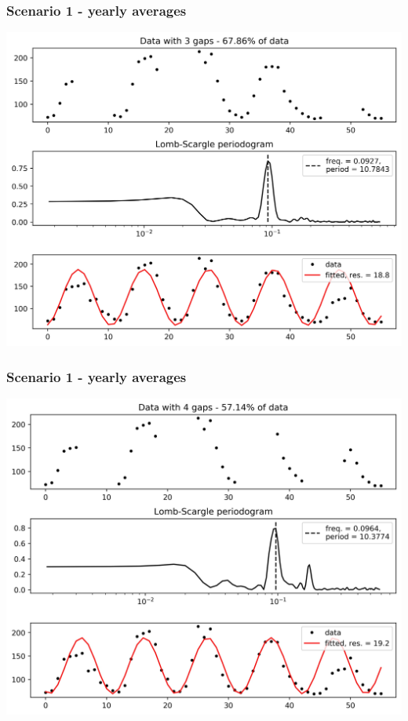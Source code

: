 \documentclass{beamer}
\begin{document}
\begin{frame}
\frametitle{Scenario 1 - yearly averages}
\begin{center}
\includegraphics[scale=0.55]{../scripts/dataset3/periodograms_ny2.0_model2_Ng3.jpg}
\end{center}
\end{frame}
\begin{frame}
\frametitle{Scenario 1 - yearly averages}
\begin{center}
\includegraphics[scale=0.55]{../scripts/dataset3/periodograms_ny2.0_model2_Ng4.jpg}
\end{center}
\end{frame}
\end{document}
